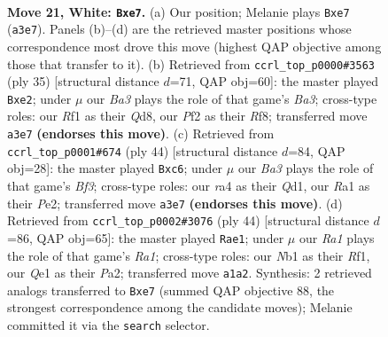 \documentclass[11pt]{article}
\begin{document}
\clearpage

\begin{figure}[p]\centering
\begin{subfigure}{0.46\textwidth}\centering
\resizebox{\linewidth}{!}{%
\newchessgame
\chessboard[
  setfen={1n1q1rk1/4bp2/5np1/7p/r1pp3P/B2P2PN/4PPK1/RN2QR2 w - - 0 21},
  showmover=false,
  pgfstyle=straightmove, color=movearrow, markmove={a3-e7}
]}
\caption{}
\end{subfigure}\hfill
\begin{subfigure}{0.46\textwidth}\centering
\resizebox{\linewidth}{!}{%
\newchessgame
\chessboard[
  setfen={1n1q1rk1/r4ppp/b2p1n2/4p3/R2PP3/6PP/4NPB1/2BQR1K1 b - - 1 18},
  showmover=false,
  pgfstyle=straightmove, color=movearrow, markmove={a6-e2}
]}
\caption{}
\end{subfigure}
\\[4pt]
\begin{subfigure}{0.46\textwidth}\centering
\resizebox{\linewidth}{!}{%
\newchessgame
\chessboard[
  setfen={3qr1k1/1r3pp1/2b2n1p/p7/3p1N2/P4BP1/1P2PP1P/3Q1RK1 w - - 0 23},
  showmover=false,
  pgfstyle=straightmove, color=movearrow, markmove={f3-c6}
]}
\caption{}
\end{subfigure}\hfill
\begin{subfigure}{0.46\textwidth}\centering
\resizebox{\linewidth}{!}{%
\newchessgame
\chessboard[
  setfen={5r1k/pp1n2bp/2p1r2q/5p1B/3p1N2/2PP2PP/PP1Q3K/R4R2 w - - 5 23},
  showmover=false,
  pgfstyle=straightmove, color=movearrow, markmove={a1-e1}
]}
\caption{}
\end{subfigure}
\caption{\textbf{Move 21, White: \texttt{Bxe7}.} (a) Our position; Melanie plays \texttt{Bxe7} (\texttt{a3e7}). Panels (b)--(d) are the retrieved master positions whose correspondence most drove this move (highest QAP objective among those that transfer to it). (b) Retrieved from \texttt{ccrl\_top\_p0000\#3563} (ply 35) [structural distance $d$=71, QAP obj=60]: the master played \texttt{Bxe2}; under $\mu$ our \emph{Ba3} plays the role of that game's \emph{Ba3}; cross-type roles: our \emph{R}f1 as their \emph{Q}d8, our \emph{P}f2 as their \emph{R}f8; transferred move \texttt{a3e7} \textbf{(endorses this move)}. (c) Retrieved from \texttt{ccrl\_top\_p0001\#674} (ply 44) [structural distance $d$=84, QAP obj=28]: the master played \texttt{Bxc6}; under $\mu$ our \emph{Ba3} plays the role of that game's \emph{Bf3}; cross-type roles: our \emph{r}a4 as their \emph{Q}d1, our \emph{R}a1 as their \emph{P}e2; transferred move \texttt{a3e7} \textbf{(endorses this move)}. (d) Retrieved from \texttt{ccrl\_top\_p0002\#3076} (ply 44) [structural distance $d$=86, QAP obj=65]: the master played \texttt{Rae1}; under $\mu$ our \emph{Ra1} plays the role of that game's \emph{Ra1}; cross-type roles: our \emph{N}b1 as their \emph{R}f1, our \emph{Q}e1 as their \emph{P}a2; transferred move \texttt{a1a2}. Synthesis: 2 retrieved analogs transferred to \texttt{Bxe7} (summed QAP objective 88, the strongest correspondence among the candidate moves); Melanie committed it via the \texttt{search} selector.}
\label{fig:thought-m40}
\end{figure}
\end{document}
